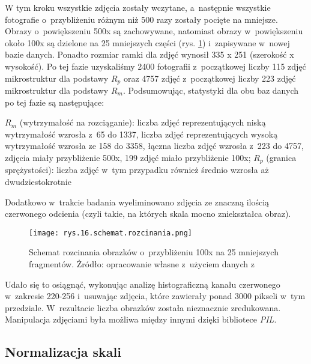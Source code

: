 W tym kroku wszystkie zdjęcia zostały wczytane, a~następnie wszystkie fotografie o~przybliżeniu różnym niż 500 razy zostały pocięte na mniejsze. Obrazy o~powiększeniu 500x są zachowywane, natomiast obrazy w~powiększeniu około 100x są dzielone na 25 mniejszych części (rys. \ref{fig:mesh16}) i~zapisywane w~nowej bazie danych. Ponadto rozmiar ramki dla zdjęć wynosił 335 x 251 (szerokość x  wysokość). Po tej fazie uzyskaliśmy 2400 fotografii z~początkowej liczby 115 zdjęć mikrostruktur dla podstawy $R_{p}$ oraz 4757 zdjęć z~początkowej liczby 223 zdjęć mikrostruktur dla podstawy $R_{m}$. Podsumowując, statystyki dla obu baz danych po tej fazie są następujące:
\begin{outline}
	\1 $R_{m}$ (wytrzymałość na rozciąganie):
		\2 liczba zdjęć reprezentujących niską wytrzymałość wzrosła z~65 do 1337,
		\2 liczba zdjęć reprezentujących wysoką wytrzymałość wzrosła ze 158 do 3358,
		\2 łączna liczba zdjęć wzrosła z~223 do 4757,
		 zdjęcia miały przybliżenie 500x, 199 zdjęć miało przybliżenie 100x;
	\1 $R_{p}$ (granica sprężystości):
		\2 liczba zdjęć w~tym przypadku również średnio wzrosła aż dwudziestokrotnie
\end{outline}
Dodatkowo w~trakcie badania wyeliminowano zdjęcia ze znaczną ilością czerwonego odcienia (czyli takie, na których skala mocno zniekształca obraz).
\begin{figure}[h]
    \centering
    \texttt{[image: rys.16.schemat.rozcinania.png]}
    \caption{Schemat rozcinania obrazków o~przybliżeniu 100x na 25 mniejszych fragmentów. Żródło: opracowanie własne z~użyciem danych z~\cite{Pirowski17}}
    \label{fig:mesh16}
\end{figure}
Udało się to osiągnąć, wykonując analizę histograficzną kanału czerwonego w~zakresie 220-256 i~usuwając zdjęcia, które zawierały ponad 3000 pikseli w~tym przedziale. W~rezultacie liczba obrazków została nieznacznie zredukowana. Manipulacja zdjęciami była możliwa między innymi dzięki bibliotece \textit{PIL}.


\subsection{Normalizacja skali}
\label{sec:normalizacja_skali}

